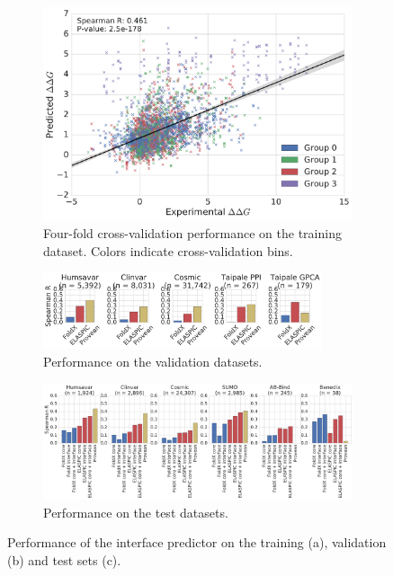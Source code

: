 \begin{figure}[!htb]
	\centering
	\begin{subfigure}[b]{1.0\textwidth}
		\centering
		\includegraphics[width=0.6\linewidth]{static/elaspic_training_set/validation/crossvalidation_performance_interface.pdf}
		\caption{Four-fold cross-validation performance on the training dataset. Colors indicate cross-validation bins.}
		\vspace*{10mm}
	\end{subfigure}
	\begin{subfigure}[b]{1.0\textwidth}
		\centering
		\includegraphics[width=0.9\textwidth]{static/elaspic_training_set/validation/validation_performance_interface.pdf}
		\caption{Performance on the validation datasets.}
		\vspace*{10mm}
	\end{subfigure}
	\begin{subfigure}[b]{1.0\textwidth}
		\centering
		\includegraphics[width=1.0\textwidth]{static/elaspic_training_set/validation/test_performance_interface.pdf}
		\caption{Performance on the test datasets.}
	\end{subfigure}
	\caption[Interface predictor validation.]{Performance of the interface predictor on the training (a), validation (b) and test sets (c).}
\end{figure}
